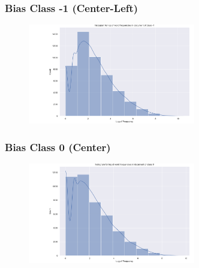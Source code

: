 \documentclass[11pt]{article}
\begin{document}
\pagebreak

\subsubsection{Bias Class -1 (Center-Left)}
\begin{center}


\TTTFIDFTable
\begin{figure}[h!]
  \includegraphics[width=0.65\textwidth]{figs/words_histogram/hist_word_-1.png}
\end{figure}
\end{center}

\pagebreak

\subsubsection{Bias Class 0 (Center)}
\begin{center}


\TTTFIDFTable
\begin{figure}[h!]
  \includegraphics[width=0.65\textwidth]{figs/words_histogram/hist_word_0.png}
\end{figure}
\end{center}

\pagebreak
\end{document}
